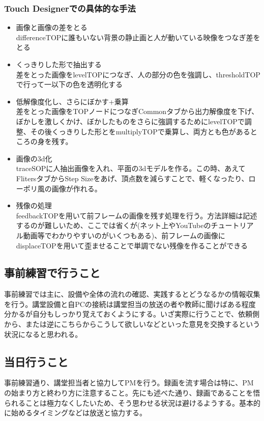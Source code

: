 \documentclass[a4paper]{ltjsreport}
\begin{document}
\subsubsection{Touch Designerでの具体的な手法}
\begin{itemize}
  \item 画像と画像の差をとる\\
        differenceTOPに誰もいない背景の静止画と人が動いている映像をつなぎ差をとる
  \item くっきりした形で抽出する\\
        差をとった画像をlevelTOPにつなぎ、人の部分の色を強調し、thresholdTOPで行って一以下の色を透明化する
  \item 低解像度化し、さらにぼかす+乗算\\
        差をとった画像をTOPノードにつなぎCommonタブから出力解像度を下げ、ぼかしを激しくかけ、ぼかしたものをさらに強調するためにlevelTOPで調整、その後くっきりした形とをmultiplyTOPで乗算し、両方とも色があるところの身を残す。
  \item 画像の3d化\\
        traceSOPに人抽出画像を入れ、平面の3dモデルを作る。この時、あえてFlitersタブからStep Sizeをあげ、頂点数を減らすことで、軽くなったり、ローポリ風の画像が作れる。
  \item 残像の処理\\
        feedbackTOPを用いて前フレームの画像を残す処理を行う。方法詳細は記述するのが難しいため、ここでは省くが(ネット上やYouTubeのチュートリアル動画等でわかりやすいのがいくつもある)、前フレームの画像にdisplaceTOPを用いて歪ませることで単調でない残像を作ることができる
\end{itemize}

\subsection{事前練習で行うこと}
事前練習では主に、設備や全体の流れの確認、実践するとどうなるかの情報収集を行う。講堂設備と自PCの接続は講堂担当の放送の者や教師に聞けばある程度分かるが自分もしっかり覚えておくようにする。いざ実際に行うことで、依頼側から、または逆にこちらからこうして欲しいなどといった意見を交換するという状況になると思われる。

\subsection{当日行うこと}
事前練習通り、講堂担当者と協力してPMを行う。録画を流す場合は特に、PMの始まり方と終わり方に注意すること。先にも述べた通り、録画であることを悟られることは極力なくしたいため、そう思わせる状況は避けるようする。基本的に始めるタイミングなどは放送と協力する。
\end{document}
